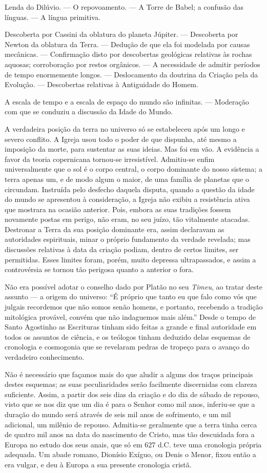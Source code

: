 \documentclass[11pt,a5paper,twoside,openany]{book}
\begin{document}
Lenda do Dilúvio. — O repovoamento. — A Torre de Babel; a confusão das línguas. — A língua primitiva.

Descoberta por Cassini da oblatura do planeta Júpiter. — Descoberta por Newton da oblatura da Terra. — Dedução de que ela foi modelada por causas mecânicas. — Confirmação disto por descobertas geológicas relativas às rochas aquosas; corroboração por restos orgânicos. — A necessidade de admitir períodos de tempo enormemente longos. — Deslocamento da doutrina da Criação pela da Evolução. — Descobertas relativas à Antiguidade do Homem.

A escala de tempo e a escala de espaço do mundo são infinitas. — Moderação com que se conduziu a discussão da Idade do Mundo.

A verdadeira posição da terra no universo só se estabeleceu após um longo e severo conflito. A Igreja usou todo o poder de que dispunha, até mesmo a imposição da morte, para sustentar as suas ideias. Mas foi em vão. A evidência a favor da teoria copernicana tornou-se irresistível. Admitiu-se enfim universalmente que o sol é o corpo central, o corpo dominante do nosso sistema; a terra apenas um, e de modo algum o maior, de uma família de planetas que o circundam. Instruída pelo desfecho daquela disputa, quando a questão da idade do mundo se apresentou à consideração, a Igreja não exibiu a resistência ativa que mostrara na ocasião anterior. Pois, embora as suas tradições fossem novamente postas em perigo, não eram, no seu juízo, tão vitalmente atacadas. Destronar a Terra da sua posição dominante era, assim declaravam as autoridades espirituais, minar o próprio fundamento da verdade revelada; mas discussões relativas à data da criação podiam, dentro de certos limites, ser permitidas. Esses limites foram, porém, muito depressa ultrapassados, e assim a controvérsia se tornou tão perigosa quanto a anterior o fora.

Não era possível adotar o conselho dado por Platão no seu \textit{Timeu}, ao tratar deste assunto — a origem do universo: “É próprio que tanto eu que falo como vós que julgais recordemos que não somos senão homens, e portanto, recebendo a tradição mitológica provável, convém que não indaguemos mais além.” Desde o tempo de Santo Agostinho as Escrituras tinham sido feitas a grande e final autoridade em todos os assuntos de ciência, e os teólogos tinham deduzido delas esquemas de cronologia e cosmogonia que se revelaram pedras de tropeço para o avanço do verdadeiro conhecimento.

Não é necessário que façamos mais do que aludir a alguns dos traços principais destes esquemas; as suas peculiaridades serão facilmente discernidas com clareza suficiente. Assim, a partir dos seis dias da criação e do dia de sábado de repouso, visto que se nos diz que um dia é para o Senhor como mil anos, inferiu-se que a duração do mundo será através de seis mil anos de sofrimento, e um mil adicional, um milênio de repouso. Admitia-se geralmente que a terra tinha cerca de quatro mil anos na data do nascimento de Cristo, mas tão descuidada fora a Europa no estudo dos seus anais, que só em 627 d.C. teve uma cronologia própria adequada. Um abade romano, Dionísio Exíguo, ou Denis o Menor, fixou então a era vulgar, e deu à Europa a sua presente cronologia cristã.
\end{document}
